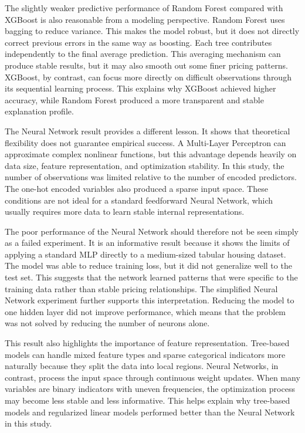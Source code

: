 \documentclass[12pt,a4paper,oneside,openany]{book}
\begin{document}
The slightly weaker predictive performance of Random Forest compared with XGBoost is also reasonable from a modeling perspective. Random Forest uses bagging to reduce variance. This makes the model robust, but it does not directly correct previous errors in the same way as boosting. Each tree contributes independently to the final average prediction. This averaging mechanism can produce stable results, but it may also smooth out some finer pricing patterns. XGBoost, by contrast, can focus more directly on difficult observations through its sequential learning process. This explains why XGBoost achieved higher accuracy, while Random Forest produced a more transparent and stable explanation profile.

The Neural Network result provides a different lesson. It shows that theoretical flexibility does not guarantee empirical success. A Multi-Layer Perceptron can approximate complex nonlinear functions, but this advantage depends heavily on data size, feature representation, and optimization stability. In this study, the number of observations was limited relative to the number of encoded predictors. The one-hot encoded variables also produced a sparse input space. These conditions are not ideal for a standard feedforward Neural Network, which usually requires more data to learn stable internal representations.

The poor performance of the Neural Network should therefore not be seen simply as a failed experiment. It is an informative result because it shows the limits of applying a standard MLP directly to a medium-sized tabular housing dataset. The model was able to reduce training loss, but it did not generalize well to the test set. This suggests that the network learned patterns that were specific to the training data rather than stable pricing relationships. The simplified Neural Network experiment further supports this interpretation. Reducing the model to one hidden layer did not improve performance, which means that the problem was not solved by reducing the number of neurons alone.

This result also highlights the importance of feature representation. Tree-based models can handle mixed feature types and sparse categorical indicators more naturally because they split the data into local regions. Neural Networks, in contrast, process the input space through continuous weight updates. When many variables are binary indicators with uneven frequencies, the optimization process may become less stable and less informative. This helps explain why tree-based models and regularized linear models performed better than the Neural Network in this study.
\end{document}

